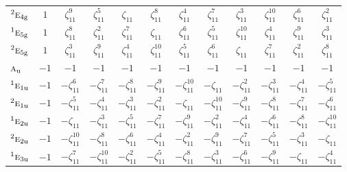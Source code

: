 \documentclass[10pt,a4paper]{article}
\numberwithin{equation}{section}
\newcommand{\irr}[1]{\text{\normalfont\scshape #1}}
\newcommand{\conjpair}[1]{{}^{#1}}
\newcommand{\ptag}[1]{\mathrm{#1}}
\newcommand{\rootunity}[1]{\zeta_{#1}}
\begin{document}
{\begin{longtable}{@{}lccccccccccc@{}}
$\conjpair{2}\irr{e}_{4\ptag{g}}$ & $1$ & $\rootunity{11}^{9}$ & $\rootunity{11}^{5}$ & $\rootunity{11}$ & $\rootunity{11}^{8}$ & $\rootunity{11}^{4}$ & $\rootunity{11}^{7}$ & $\rootunity{11}^{3}$ & $\rootunity{11}^{10}$ & $\rootunity{11}^{6}$ & $\rootunity{11}^{2}$\\
$\conjpair{1}\irr{e}_{5\ptag{g}}$ & $1$ & $\rootunity{11}^{8}$ & $\rootunity{11}^{2}$ & $\rootunity{11}^{7}$ & $\rootunity{11}$ & $\rootunity{11}^{6}$ & $\rootunity{11}^{5}$ & $\rootunity{11}^{10}$ & $\rootunity{11}^{4}$ & $\rootunity{11}^{9}$ & $\rootunity{11}^{3}$\\
$\conjpair{2}\irr{e}_{5\ptag{g}}$ & $1$ & $\rootunity{11}^{3}$ & $\rootunity{11}^{9}$ & $\rootunity{11}^{4}$ & $\rootunity{11}^{10}$ & $\rootunity{11}^{5}$ & $\rootunity{11}^{6}$ & $\rootunity{11}$ & $\rootunity{11}^{7}$ & $\rootunity{11}^{2}$ & $\rootunity{11}^{8}$\\
$\irr{a}_{\ptag{u}}$ & $-1$ & $-1$ & $-1$ & $-1$ & $-1$ & $-1$ & $-1$ & $-1$ & $-1$ & $-1$ & $-1$\\
$\conjpair{1}\irr{e}_{1\ptag{u}}$ & $-1$ & $-\rootunity{11}^{6}$ & $-\rootunity{11}^{7}$ & $-\rootunity{11}^{8}$ & $-\rootunity{11}^{9}$ & $-\rootunity{11}^{10}$ & $-\rootunity{11}$ & $-\rootunity{11}^{2}$ & $-\rootunity{11}^{3}$ & $-\rootunity{11}^{4}$ & $-\rootunity{11}^{5}$\\
$\conjpair{2}\irr{e}_{1\ptag{u}}$ & $-1$ & $-\rootunity{11}^{5}$ & $-\rootunity{11}^{4}$ & $-\rootunity{11}^{3}$ & $-\rootunity{11}^{2}$ & $-\rootunity{11}$ & $-\rootunity{11}^{10}$ & $-\rootunity{11}^{9}$ & $-\rootunity{11}^{8}$ & $-\rootunity{11}^{7}$ & $-\rootunity{11}^{6}$\\
$\conjpair{1}\irr{e}_{2\ptag{u}}$ & $-1$ & $-\rootunity{11}$ & $-\rootunity{11}^{3}$ & $-\rootunity{11}^{5}$ & $-\rootunity{11}^{7}$ & $-\rootunity{11}^{9}$ & $-\rootunity{11}^{2}$ & $-\rootunity{11}^{4}$ & $-\rootunity{11}^{6}$ & $-\rootunity{11}^{8}$ & $-\rootunity{11}^{10}$\\
$\conjpair{2}\irr{e}_{2\ptag{u}}$ & $-1$ & $-\rootunity{11}^{10}$ & $-\rootunity{11}^{8}$ & $-\rootunity{11}^{6}$ & $-\rootunity{11}^{4}$ & $-\rootunity{11}^{2}$ & $-\rootunity{11}^{9}$ & $-\rootunity{11}^{7}$ & $-\rootunity{11}^{5}$ & $-\rootunity{11}^{3}$ & $-\rootunity{11}$\\
$\conjpair{1}\irr{e}_{3\ptag{u}}$ & $-1$ & $-\rootunity{11}^{7}$ & $-\rootunity{11}^{10}$ & $-\rootunity{11}^{2}$ & $-\rootunity{11}^{5}$ & $-\rootunity{11}^{8}$ & $-\rootunity{11}^{3}$ & $-\rootunity{11}^{6}$ & $-\rootunity{11}^{9}$ & $-\rootunity{11}$ & $-\rootunity{11}^{4}$\\

\end{longtable}}
\end{document}
